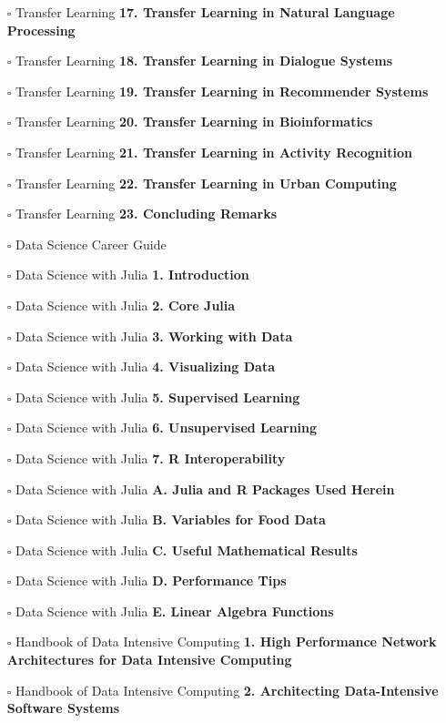 \documentclass[a4, landscape, 12pt]{article}
\newcommand{\checkbox}{$\square$}%
\begin{document}
\begin{itemize}
{}
\item [\checkbox]  Transfer Learning \textbf{ 17. Transfer Learning in Natural Language Processing
}
\item [\checkbox]  Transfer Learning \textbf{ 18. Transfer Learning in Dialogue Systems
}
\item [\checkbox]  Transfer Learning \textbf{ 19. Transfer Learning in Recommender Systems
}
\item [\checkbox]  Transfer Learning \textbf{ 20. Transfer Learning in Bioinformatics
}
\item [\checkbox]  Transfer Learning \textbf{ 21. Transfer Learning in Activity Recognition
}
\item [\checkbox]  Transfer Learning \textbf{ 22. Transfer Learning in Urban Computing
}
\item [\checkbox]  Transfer Learning \textbf{ 23. Concluding Remarks
}
\item [\checkbox]  Data Science Career Guide \textbf{
}
\item [\checkbox]  Data Science with Julia \textbf{ 1. Introduction
}
\item [\checkbox]  Data Science with Julia \textbf{ 2. Core Julia
}
\item [\checkbox]  Data Science with Julia \textbf{ 3. Working with Data
}
\item [\checkbox]  Data Science with Julia \textbf{ 4. Visualizing Data
}
\item [\checkbox]  Data Science with Julia \textbf{ 5. Supervised Learning
}
\item [\checkbox]  Data Science with Julia \textbf{ 6. Unsupervised Learning
}
\item [\checkbox]  Data Science with Julia \textbf{ 7. R Interoperability
}
\item [\checkbox]  Data Science with Julia \textbf{ A. Julia and R Packages Used Herein
}
\item [\checkbox]  Data Science with Julia \textbf{ B. Variables for Food Data
}
\item [\checkbox]  Data Science with Julia \textbf{ C. Useful Mathematical Results
}
\item [\checkbox]  Data Science with Julia \textbf{ D. Performance Tips
}
\item [\checkbox]  Data Science with Julia \textbf{ E. Linear Algebra Functions
}
\item [\checkbox]  Handbook of Data Intensive Computing \textbf{ 1. High Performance Network Architectures for Data Intensive Computing
}
\item [\checkbox]  Handbook of Data Intensive Computing \textbf{ 2. Architecting Data-Intensive Software Systems
}
\end{itemize}
\end{document}
